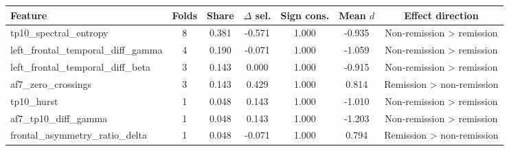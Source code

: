 \begin{tabular}{lcccccc}
\toprule
Feature & Folds & Share & $\Delta$ sel. & Sign cons. & Mean $d$ & Effect direction \\
\midrule
tp10\_spectral\_entropy & 8 & 0.381 & -0.571 & 1.000 & -0.935 & Non-remission > remission \\
left\_frontal\_temporal\_diff\_gamma & 4 & 0.190 & -0.071 & 1.000 & -1.059 & Non-remission > remission \\
left\_frontal\_temporal\_diff\_beta & 3 & 0.143 & 0.000 & 1.000 & -0.915 & Non-remission > remission \\
af7\_zero\_crossings & 3 & 0.143 & 0.429 & 1.000 & 0.814 & Remission > non-remission \\
tp10\_hurst & 1 & 0.048 & 0.143 & 1.000 & -1.010 & Non-remission > remission \\
af7\_tp10\_diff\_gamma & 1 & 0.048 & 0.143 & 1.000 & -1.203 & Non-remission > remission \\
frontal\_asymmetry\_ratio\_delta & 1 & 0.048 & -0.071 & 1.000 & 0.794 & Remission > non-remission \\
\bottomrule
\end{tabular}

